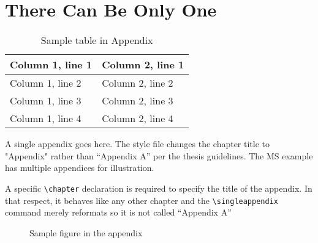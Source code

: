 \documentclass[dvips,11pt,oneside]{report}
\begin{document}

\singleappendix  \chapter{There Can Be Only One} 


\begin{table} \caption{Sample table in Appendix} \begin{center}
\begin{tabular}{|l|l|} \hline
Column 1, line 1 & Column 2, line 1 \\ \hline
Column 1, line 2 & Column 2, line 2 \\ \hline
Column 1, line 3 & Column 2, line 3 \\ \hline
Column 1, line 4 & Column 2, line 4 \\ \hline
\end{tabular} \end{center} \end{table}


A single appendix goes here.  The style file changes
the chapter title to "Appendix" rather than ``Appendix A'' per the thesis
guidelines.  The MS example has multiple appendices for illustration.

A specific \verb+\chapter+ declaration is required to specify the title of the
appendix.  In that respect, it behaves like any other chapter and the
\verb+\singleappendix+ command merely reformats so it is not called ``Appendix
A''

\begin{figure} \caption{Sample figure in the appendix} \begin{center}
\end{center} \end{figure}
\end{document}
